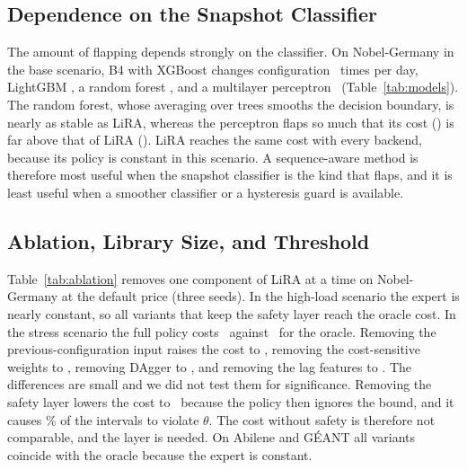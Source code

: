 \documentclass[journal]{IEEEtran}
\begin{document}
\subsection{Dependence on the Snapshot Classifier}\label{sec:res-models}

The amount of flapping depends strongly on the classifier. On Nobel-Germany in the base scenario, B4 with XGBoost changes configuration \modXgbChg\ times per day, LightGBM \modLgbmChg, a random forest \modRfChg, and a multilayer perceptron \modMlpChg\ (Table~\ref{tab:models}). The random forest, whose averaging over trees smooths the decision boundary, is nearly as stable as LiRA, whereas the perceptron flaps so much that its cost (\modMlpJ) is far above that of LiRA (\nobJlira). LiRA reaches the same cost with every backend, because its policy is constant in this scenario. A sequence-aware method is therefore most useful when the snapshot classifier is the kind that flaps, and it is least useful when a smoother classifier or a hysteresis guard is available.

\begin{table}[t]
\centering
\caption{Choice of Model on Nobel-Germany (Base Scenario, Seed 0). Chg/d: Changes per Day}
\label{tab:models}
\footnotesize
\setlength{\tabcolsep}{3pt}

\end{table}

\subsection{Ablation, Library Size, and Threshold}\label{sec:res-ablation}

Table~\ref{tab:ablation} removes one component of LiRA at a time on Nobel-Germany at the default price (three seeds). In the high-load scenario the expert is nearly constant, so all variants that keep the safety layer reach the oracle cost. In the stress scenario the full policy costs \ablStressFull\ against \ablStressO\ for the oracle. Removing the previous-configuration input raises the cost to \ablStressNoPrev, removing the cost-sensitive weights to \ablStressNoCS, removing DAgger to \ablStressNoDagger, and removing the lag features to \ablStressNoLag. The differences are small and we did not test them for significance. Removing the safety layer lowers the cost to \ablStressNoSafe\ because the policy then ignores the bound, and it causes \ablStressNoSafeViol\% of the intervals to violate $\theta$. The cost without safety is therefore not comparable, and the layer is needed. On Abilene and G\'{E}ANT all variants coincide with the oracle because the expert is constant.
\end{document}
